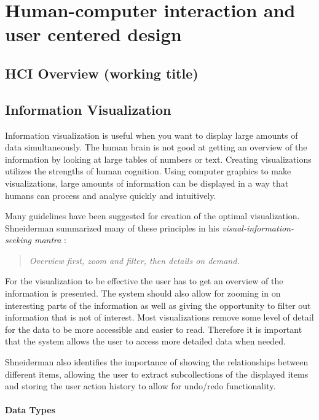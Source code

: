 \chapter{Human-computer interaction and user centered design}

\section{HCI Overview (working title)}

\section{Information Visualization}
Information visualization is useful when you want to display large amounts of data simultaneously. The human brain is not good at getting an overview of the information by looking at large tables of numbers or text. Creating visualizations utilizes the strengths of human cognition. Using computer graphics to make visualizations, large amounts of information can be displayed in a way that humans can process and analyse quickly and intuitively.

Many guidelines have been suggested for creation of the optimal visualization. Shneiderman summarized many of these principles in his \emph{visual-information-seeking mantra} \cite{shneiderman}:
\begin{quote}
\textit{Overview first, zoom and filter, then details on demand.}
\end{quote}

For the visualization to be effective the user has to get an overview of the information is presented. The system should also allow for zooming in on interesting parts of the information as well as giving the opportunity to filter out information that is not of interest. Most visualizations remove some level of detail for the data to be more accessible and easier to read. Therefore it is important that the system allows the user to access more detailed data when needed.

Shneiderman also identifies the importance of showing the relationships between different items, allowing the user to extract subcollections of the displayed items and storing the user action history to allow for undo/redo functionality.

\subsubsection{Data Types}

